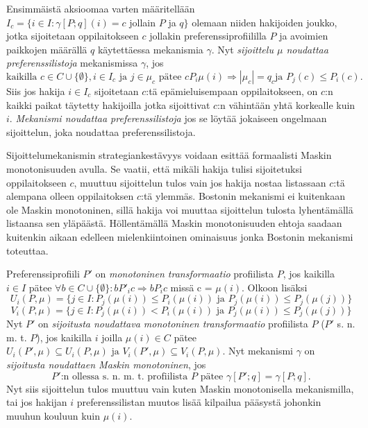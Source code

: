 \documentclass[gradu]{tktltiki}
\begin{document}
Ensimmäistä aksioomaa varten määritellään \\ \(I_c = \{i \in I :
\gamma [P;q](i) = c\) jollain \(P\) ja \(q\}\) olemaan niiden
hakijoiden joukko, jotka sijoitetaan oppilaitokseen \(c\) jollakin
preferenssiprofiililla \(P\) ja avoimien paikkojen määrällä \(q\)
käytettäessa mekanismia \(\gamma\). Nyt \emph{sijoittelu \(\mu\)
  noudattaa preferenssilistoja} mekanismissa \(\gamma\),
jos \[\text{kaikilla }c \in C \cup \{\emptyset\}, i \in I_c\text{ ja }
j \in \mu_c\text{ pätee }cP_{i}\mu(i) \Rightarrow |\mu_c| = q_c\text{
  ja }P_j(c) \leq P_i(c).\] Siis jos hakija \(i \in I_c\) sijoitetaan
\(c\):tä epämieluisempaan oppilaitokseen, on \(c\):n kaikki paikat
täytetty hakijoilla jotka sijoittivat \(c\):n vähintään yhtä korkealle
kuin \(i\). \emph{Mekanismi noudattaa preferenssilistoja} jos se
löytää jokaiseen ongelmaan sijoittelun, joka noudattaa
preferenssilistoja.

Sijoittelumekanismin strategiankestävyys voidaan esittää formaalisti
Maskin monotonisuuden avulla. Se vaatii, että mikäli hakija tulisi
sijoitetuksi oppilaitokseen \(c\), muuttuu sijoittelun tulos vain jos
hakija nostaa listassaan \(c\):tä alempana olleen oppilaitoksen
\(c\):tä ylemmäs. Bostonin mekanismi ei kuitenkaan ole Maskin
monotoninen, sillä hakija voi muuttaa sijoittelun tulosta lyhentämällä
listaansa sen yläpäästä. Höllentämällä Maskin monotonisuuden ehtoja
saadaan kuitenkin aikaan edelleen mielenkiintoinen ominaisuus jonka
Bostonin mekanismi toteuttaa.

Preferenssiprofiili \(P'\) on \emph{monotoninen transformaatio}
profiilista \(P\), jos kaikilla \(i \in I\) pätee \(\forall b \in C
\cup \{\emptyset\}:bP'_{i}c \Rightarrow bP_{i}c\) missä c =
\(\mu(i)\). Olkoon lisäksi \[U_i(P,\mu) = \{j \in I : P_j(\mu (i)) \leq
P_i(\mu (i)) \text{ ja } P_j(\mu (i)) \leq P_j(\mu (j))\}\]
\[V_i(P,\mu) = \{j \in I : P_j(\mu (i)) < P_i(\mu (i)) \text{ ja } P_j(\mu
(i)) \leq P_j(\mu (j))\}\] Nyt \(P'\) on \emph{sijoitusta noudattava
  monotoninen transformaatio} profiilista \(P\) (\(P'\) s. n. m. t.
\(P\)), jos kaikilla \(i\) joilla \(\mu (i) \in C\) pätee
\(U_i(P',\mu) \subseteq U_i(P,\mu) \text{ ja } V_i(P',\mu) \subseteq
V_i(P,\mu)\). Nyt mekanismi \(\gamma\) on \emph{sijoitusta noudattaen
  Maskin monotoninen}, jos \[P'\text{:n ollessa s. n. m. t.
  profiilista }P \text{ pätee }\gamma [P';q] = \gamma [P;q].\] Nyt
siis sijoittelun tulos muuttuu vain kuten Maskin monotonisella
mekanismilla, tai jos hakijan \(i\) preferenssilistan muutos lisää
kilpailua pääsystä johonkin muuhun kouluun kuin \(\mu (i)\).
\end{document}
